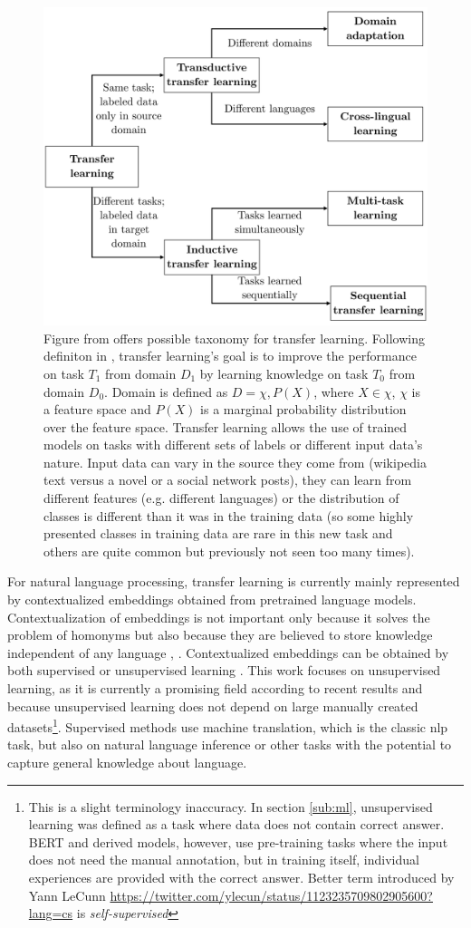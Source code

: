 \begin{figure}[H]
\centering
\includegraphics[width=0.7\columnwidth]{../img/tl_taxonomy}
\caption{Figure from \protect\citep{Ruder2019} offers possible taxonomy for transfer learning. %
Following definiton in \citep{Pan2009}, transfer learning's goal is to improve the performance on task $T_1$ from domain $D_1$ by learning knowledge on task $T_0$ from domain $D_0$. Domain is defined as $D = {\chi,P(X)}$, where $X \in \chi$, $\chi$ is a feature space and $P(X)$ is a marginal probability distribution over the feature space. Transfer learning allows the use of trained models on tasks with different sets of labels or different input data's nature. Input data can vary in the source they come from (wikipedia text versus a novel or a social network posts), they can learn from different features (e.g. different languages) or the distribution of classes is different than it was in the training data (so some highly presented classes in training data are rare in this new task and others are quite common but previously not seen too many times).
}
\label{pic:tl_taxonomy}
\end{figure}
For natural language processing, transfer learning is currently mainly represented by contextualized embeddings obtained from pretrained language models.
Contextualization of embeddings is not important only because it solves the problem of homonyms but also because they are believed to store knowledge independent of any language \citep{Feijo2020}, \citep{Hewitt2020}. Contextualized embeddings can be obtained by both supervised or unsupervised learning \citep{Liu2020}. This work focuses on unsupervised learning, as it is currently a promising field according to recent results and because unsupervised learning does not depend on large manually created datasets\footnote{This is a slight terminology inaccuracy. In section \ref{sub:ml}, unsupervised learning was defined as a task where data does not contain correct answer. BERT and derived models, however, use pre-training tasks where the input does not need the manual annotation, but in training itself, individual experiences are provided with the correct answer. Better term introduced by Yann LeCunn \url{https://twitter.com/ylecun/status/1123235709802905600?lang=cs} is \textit{self-supervised}}. Supervised methods use machine translation, which is the classic \acrshort{nlp} task, but also on natural language inference or other tasks with the potential to capture general knowledge about language.
